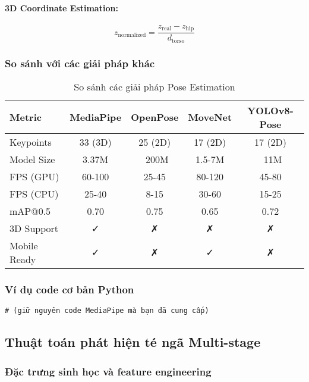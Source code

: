 \paragraph{3D Coordinate Estimation:}
\begin{equation}
z_{\text{normalized}} = \frac{z_{\text{real}} - z_{\text{hip}}}{d_{\text{torso}}}
\end{equation}

\subsubsection{So sánh với các giải pháp khác}
\begin{table}[htbp]
\centering
\caption{So sánh các giải pháp Pose Estimation}
\begin{tabular}{|l|c|c|c|c|}
\hline
Metric & MediaPipe & OpenPose & MoveNet & YOLOv8-Pose \\
\hline
Keypoints & 33 (3D) & 25 (2D) & 17 (2D) & 17 (2D) \\
Model Size & 3.37M & ~200M & 1.5-7M & ~11M \\
FPS (GPU) & 60-100 & 25-45 & 80-120 & 45-80 \\
FPS (CPU) & 25-40 & 8-15 & 30-60 & 15-25 \\
mAP@0.5 & 0.70 & 0.75 & 0.65 & 0.72 \\
3D Support & ✓ & ✗ & ✗ & ✗ \\
Mobile Ready & ✓ & ✗ & ✓ & ✗ \\
\hline
\end{tabular}
\end{table}

\subsubsection{Ví dụ code cơ bản Python}
\begin{verbatim}
# (giữ nguyên code MediaPipe mà bạn đã cung cấp)
\end{verbatim}

\subsection{Thuật toán phát hiện té ngã Multi-stage}

\subsubsection{Đặc trưng sinh học và feature engineering}
